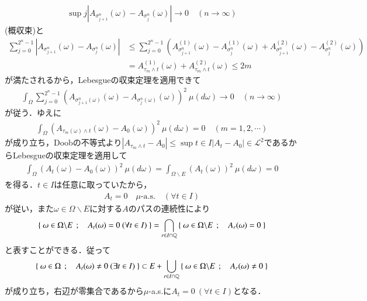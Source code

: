 \begin{prf}
		\begin{align}
			\sup{j}{\left| A_{\sigma_{j+1}^n}(\omega) - A_{\sigma_j^n}(\omega) \right|} \longrightarrow 0 \quad (n \longrightarrow \infty)
		\end{align}
		(概収束)と
		\begin{align}
			\sum_{j=0}^{2^n-1} \left| A_{\sigma_{j+1}^n}(\omega) - A_{\sigma_j^n}(\omega) \right|
			&\leq \sum_{j=0}^{2^n-1} \left( A^{(1)}_{\sigma_{j+1}^n}(\omega) - A^{(1)}_{\sigma_j^n}(\omega) + A^{(2)}_{\sigma_{j+1}^n}(\omega) - A^{(2)}_{\sigma_j^n}(\omega) \right) \\
			&= A^{(1)}_{\tau_m \wedge t}(\omega) + A^{(2)}_{\tau_m \wedge t}(\omega) \leq 2m
		\end{align}
		が満たされるから，Lebesgueの収束定理を適用できて
		\begin{align}
			\int_\Omega \sum_{j=0}^{2^n-1} \left( A_{\sigma_{j+1}^n(\omega)}(\omega) - A_{\sigma_j^n(\omega)}(\omega) \right)^2\ \mu(d\omega) \longrightarrow 0 \quad (n \longrightarrow \infty)
		\end{align}
		が従う．ゆえに
		\begin{align}
			\int_\Omega \left( A_{\tau_m(\omega) \wedge t}(\omega) - A_{0}(\omega) \right)^2\ \mu(d\omega) = 0 \quad (m=1,2,\cdots)
		\end{align}
		が成り立ち，Doobの不等式より$|A_{\tau_m \wedge t} - A_{0}| \leq \sup{t \in I}{|A_t - A_{0}|} \in \mathscr{L}^2$であるからLebesgueの収束定理を適用して
		\begin{align}
			\int_\Omega \left( A_t(\omega) - A_{0}(\omega) \right)^2\ \mu(d\omega) 
			= \int_{\Omega \backslash E} \left( A_t(\omega) \right)^2\ \mu(d\omega)
			= 0
		\end{align}
		を得る．$t \in I$は任意に取っていたから，
		\begin{align}
			A_t = 0 \quad \mbox{$\mu$-a.s.} \quad (\forall t \in I)
		\end{align}
		が従い，また$\omega \in \Omega \backslash E$に対する$A$のパスの連続性により
		\begin{align}
			\Set{\omega \in \Omega \backslash E}{A_t(\omega) = 0\ (\forall t \in I)}
			= \bigcap_{r \in I \cap \Q} \Set{\omega \in \Omega \backslash E}{A_r(\omega) = 0}
		\end{align}
		と表すことができる．従って
		\begin{align}
			\left\{\ \omega \in \Omega\ \, ; \quad A_t(\omega) \neq 0\ (\exists t \in I)\ \right\}
			\subset E + \bigcup_{r \in I \cap \mathbb{Q}} \left\{\ \omega \in \Omega \backslash E\ \, ; \quad A_r(\omega) \neq 0\ \right\}
		\end{align}
		が成り立ち，右辺が零集合であるから$\mu$-a.s.に$A_t = 0\ (\forall t \in I)$となる．
		\QED
	\end{prf}
	
